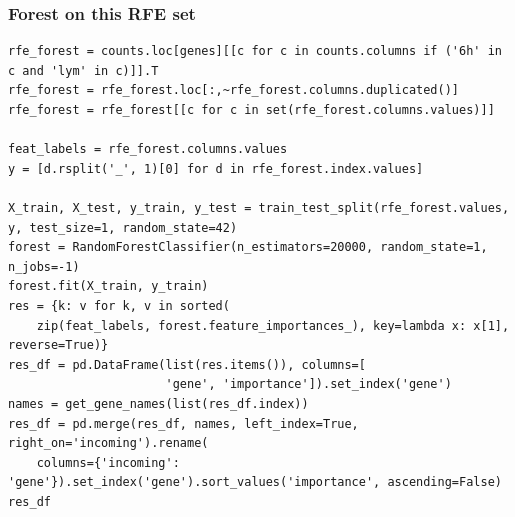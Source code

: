 \documentclass[11pt]{article}
\begin{document}
\subsubsection{Forest on this RFE set}
\label{sec:orge7324dc}

\begin{verbatim}
rfe_forest = counts.loc[genes][[c for c in counts.columns if ('6h' in c and 'lym' in c)]].T
rfe_forest = rfe_forest.loc[:,~rfe_forest.columns.duplicated()]
rfe_forest = rfe_forest[[c for c in set(rfe_forest.columns.values)]]

feat_labels = rfe_forest.columns.values
y = [d.rsplit('_', 1)[0] for d in rfe_forest.index.values]

X_train, X_test, y_train, y_test = train_test_split(rfe_forest.values, y, test_size=1, random_state=42)
forest = RandomForestClassifier(n_estimators=20000, random_state=1, n_jobs=-1)
forest.fit(X_train, y_train)
res = {k: v for k, v in sorted(
    zip(feat_labels, forest.feature_importances_), key=lambda x: x[1], reverse=True)}
res_df = pd.DataFrame(list(res.items()), columns=[
                      'gene', 'importance']).set_index('gene')
names = get_gene_names(list(res_df.index))
res_df = pd.merge(res_df, names, left_index=True, right_on='incoming').rename(
    columns={'incoming': 'gene'}).set_index('gene').sort_values('importance', ascending=False)
res_df
\end{verbatim}
\end{document}

